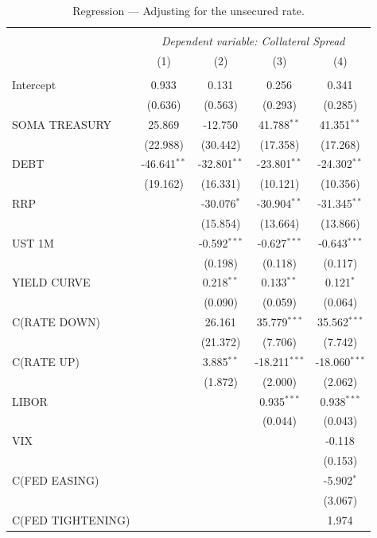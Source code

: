 \documentclass[11pt,a4paper,english,oneside]{article}
\begin{document}
\begin{table}[!htbp] \centering
\caption{Regression --- Adjusting for the unsecured rate.}
\label{table:reg2}
\begin{tabular}{@{\extracolsep{5pt}}lcccc}
\\[-1.8ex]\hline
\hline \\[-1.8ex]
& \multicolumn{4}{c}{\textit{Dependent variable: Collateral Spread}} \
\cr \cline{4-5}
\\[-1.8ex] & (1) & (2) & (3) & (4) \\
\hline \\[-1.8ex]
 Intercept & 0.933$^{}$ & 0.131$^{}$ & 0.256$^{}$ & 0.341$^{}$ \\
  & (0.636) & (0.563) & (0.293) & (0.285) \\
 SOMA TREASURY & 25.869$^{}$ & -12.750$^{}$ & 41.788$^{**}$ & 41.351$^{**}$ \\
  & (22.988) & (30.442) & (17.358) & (17.268) \\
 DEBT & -46.641$^{**}$ & -32.801$^{**}$ & -23.801$^{**}$ & -24.302$^{**}$ \\
  & (19.162) & (16.331) & (10.121) & (10.356) \\
 RRP & & -30.076$^{*}$ & -30.904$^{**}$ & -31.345$^{**}$ \\
  & & (15.854) & (13.664) & (13.866) \\
 UST 1M & & -0.592$^{***}$ & -0.627$^{***}$ & -0.643$^{***}$ \\
  & & (0.198) & (0.118) & (0.117) \\
 YIELD CURVE & & 0.218$^{**}$ & 0.133$^{**}$ & 0.121$^{*}$ \\
  & & (0.090) & (0.059) & (0.064) \\
 C(RATE DOWN) & & 26.161$^{}$ & 35.779$^{***}$ & 35.562$^{***}$ \\
  & & (21.372) & (7.706) & (7.742) \\
 C(RATE UP) & & 3.885$^{**}$ & -18.211$^{***}$ & -18.060$^{***}$ \\
  & & (1.872) & (2.000) & (2.062) \\
 LIBOR & & & 0.935$^{***}$ & 0.938$^{***}$ \\
  & & & (0.044) & (0.043) \\
 VIX & & & & -0.118$^{}$ \\
  & & & & (0.153) \\
 C(FED EASING) & & & & -5.902$^{*}$ \\
  & & & & (3.067) \\
 C(FED TIGHTENING) & & & & 1.974$^{}$ \\

\end{tabular}
\end{table}
\end{document}
